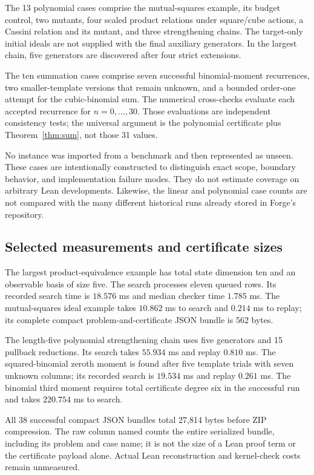 The 13 polynomial cases comprise the mutual-squares example, its budget control,
two mutants, four scaled product relations under square/cube actions, a Cassini
relation and its mutant, and three strengthening chains. The target-only
initial ideals are not supplied with the final auxiliary generators. In the
largest chain, five generators are discovered after four strict extensions.

The ten summation cases comprise seven successful binomial-moment recurrences,
two smaller-template versions that remain unknown, and a bounded order-one
attempt for the cubic-binomial sum. The numerical cross-checks evaluate each
accepted recurrence for $n=0,\ldots,30$. Those evaluations are independent
consistency tests; the universal argument is the polynomial certificate plus
Theorem~\ref{thm:sum}, not those 31 values.

No instance was imported from a benchmark and then represented as unseen.
These cases are intentionally constructed to distinguish exact scope, boundary
behavior, and implementation failure modes. They do not estimate coverage on
arbitrary Lean developments. Likewise, the linear and polynomial case counts
are not compared with the many different historical runs already stored in
Forge's repository.

\subsection{Selected measurements and certificate sizes}

The largest product-equivalence example has total state dimension ten and an
observable basis of size five. The search processes eleven queued rows. Its
recorded search time is $18.576$ ms and median checker time $1.785$ ms. The
mutual-squares ideal example takes $10.862$ ms to search and $0.214$ ms to replay;
its complete compact problem-and-certificate JSON bundle is 562 bytes.

The length-five polynomial strengthening chain uses five generators and 15
pullback reductions. Its search takes $55.934$ ms and replay $0.810$ ms. The
squared-binomial zeroth moment is found after five template trials with seven
unknown columns; its recorded search is $19.534$ ms and replay $0.261$ ms. The
binomial third moment requires total certificate degree six in the successful
run and takes $220.754$ ms to search.

All 38 successful compact JSON bundles total 27,814 bytes before ZIP
compression. The raw column named  counts the entire
serialized bundle, including its problem and case name; it is not the size of a
Lean proof term or the certificate payload alone. Actual Lean reconstruction
and kernel-check costs remain unmeasured.

